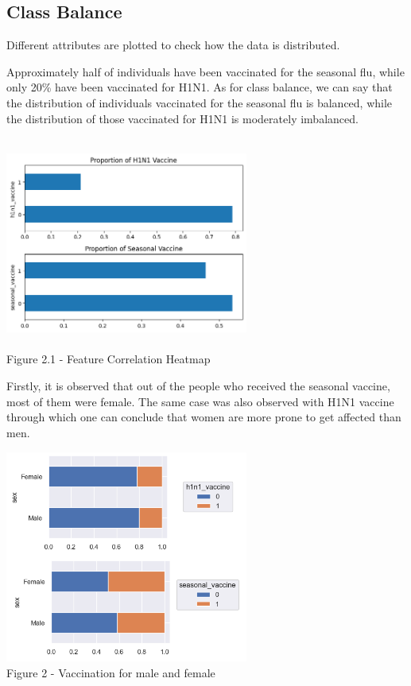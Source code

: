 \documentclass{IEEEtran}
\begin{document}
\subsection{Class Balance}
Different attributes are plotted to check how the data is distributed. 

Approximately half of individuals have been vaccinated for the seasonal flu, while only 20\% have been vaccinated for H1N1. As for class balance, we can say that the distribution of individuals vaccinated for the seasonal flu is balanced, while the distribution of those vaccinated for H1N1 is moderately imbalanced.
\begin{center}
    \includegraphics[width = 8cm,height=7cm]{figures/Proportion.png}\\  
    Figure 2.1 - Feature Correlation Heatmap
\end{center}
Firstly, it is observed that out of the people who received the seasonal vaccine, most of them were female. The same case was also observed with H1N1 vaccine through which one can conclude that women are more prone to get affected than men.
\begin{center}
    \includegraphics[width = 8cm,height=7cm]{figures/Sex.png}\\  Figure 2 - Vaccination for male and female
\end{center}
\end{document}
